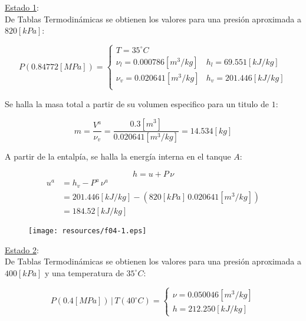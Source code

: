 \documentclass[letter,11pt]{article}
\begin{document}
\begin{enumerate}
\underline{Estado 1}: \\
De Tablas Termodinámicas se obtienen los valores para una presión aproximada a
$820[kPa]$:

\begin{equation*}
    P(0.84772[MPa]) = \begin{cases}
        T = 35^\circ C \\
        \nu_l = 0.000786[m^3/kg] & h_l = 69.551[kJ/kg] \\
        \nu_v = 0.020641[m^3/kg] & h_v = 201.446[kJ/kg] \\
    \end{cases}
\end{equation*}

Se halla la masa total a partir de su volumen especifico para un titulo de $1$:

\begin{equation*}
    m = \frac{V^a}{\nu_v} = \frac{0.3[m^3]}{0.020641[m^3/kg]}
      = 14.534[kg]
\end{equation*}

A partir de la entalpía, se halla la energía interna en el tanque $A$:

\begin{equation*}
    h = u + P\,\nu
\end{equation*}
\begin{equation*}
    \begin{split}
        u^a &= h_v - P^a\,\nu^a \\
            &= 201.446[kJ/kg] - (820[kPa]\,0.020641[m^3/kg]) \\
            &= 184.52[kJ/kg]
    \end{split}
\end{equation*}

\begin{figure}[H]
\centering
\texttt{[image: resources/f04-1.eps]}
\end{figure}

\underline{Estado 2}: \\
De Tablas Termodinámicas se obtienen los valores para una presión aproximada a
$400[kPa]$ y una temperatura de $35^\circ C$:

\begin{equation*}
    P(0.4[MPa])\,|\,T(40^\circ C) = \begin{cases}
        \nu = 0.050046[m^3/kg] \\
        h = 212.250[kJ/kg]
    \end{cases}
\end{equation*}


\end{enumerate}
\end{document}
